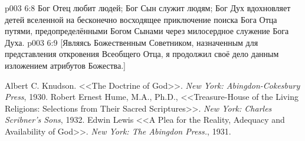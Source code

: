 \vs p003 6:8 \pc Бог Отец любит людей; Бог Сын служит людям; Бог Дух вдохновляет детей вселенной на бесконечно восходящее приключение поиска Бога Отца путями, предопределёнными Богом Сынами через милосердное служение Бога Духа.
\vsetoff
\vs p003 6:9 [Являясь Божественным Советником, назначенным для представления откровения Всеобщего Отца, я продолжил своё дело данным изложением атрибутов Божества.]
\quizlink
\begin{thebibliography}{100}
Albert C. Knudson.
{<<The Doctrine of God>>.}
{\em New York: Abingdon-Cokesbury Press}, 1930.
Robert Ernest Hume, M.A., Ph.D.,
{<<Treasure\hyp{}House of the Living Religions: Selections from Their Sacred Scriptures>>.}
{\em New York: Charles Scribner's Sons}, 1932.
Edwin Lewis
{<<A Plea for the Reality, Adequacy and Availability of God>>.}
{\em New York: The Abingdon Press.}, 1931.
\end{thebibliography}
